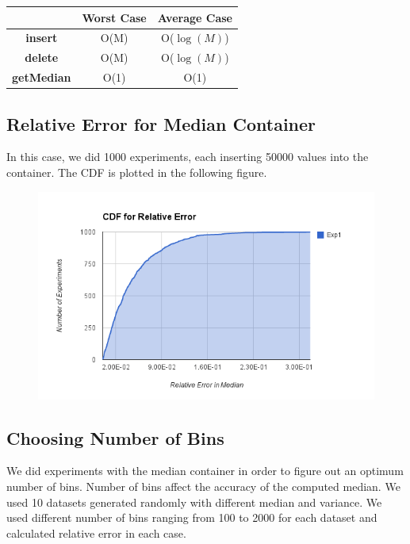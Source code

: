 \begin{table}[h]
\begin{center}
\begin{tabular}{|c|c|c|}
\hline 
 & \textbf{Worst Case} & \textbf{Average Case} \\ 
\hline 
\textbf{insert} & O(M) & O($\log(M)$) \\
\hline 
\textbf{delete} & O(M) & O($\log(M)$) \\
\hline 
\textbf{getMedian} & O(1) & O(1) \\ 
\hline 
\end{tabular} 
\end{center}
\end{table}

\subsection{Relative Error for Median Container}
In this case, we did 1000 experiments, each inserting 50000 values into the container. The CDF is plotted in the following figure.

\begin{figure}[h]
\begin{center}
\includegraphics[scale=0.4]{img/relative_error}
\end{center}
\end{figure}

\subsection{Choosing Number of Bins}
We did experiments with the median container in order to figure out an optimum number of bins. Number of bins affect the accuracy of the computed median. We used 10 datasets generated randomly with different median and variance. We used different number of bins ranging from 100 to 2000 for each dataset and calculated relative error in each case.

